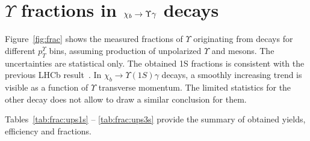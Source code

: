 \section[$\Upsilon$ fractions]{\texorpdfstring{$\Upsilon$}{Y} fractions in \texorpdfstring{$\chi_{{b}} \rightarrow \Upsilon \gamma$}{chib --> Y gamma} decays}
\label{sec:fraction}

Figure~\ref{fig:frac} shows the measured fractions of $\Upsilon$ originating
from \chib decays for different $p_T^{\Upsilon}$ bins,  assuming production of
unpolarized $\Upsilon$ and \chib mesons. The uncertainties are statistical
only. The obtained \Y1S fractions is consistent with the previous LHCb
result~\cite{LHCb-PAPER-2012-015}. In $\chi_b \rightarrow \Upsilon(1S) \gamma$
decays, a smoothly increasing trend is visible as a function of $\Upsilon$
transverse momentum. The limited statistics for the other decay does not allow
to draw a similar conclusion for them.




Tables~\ref{tab:frac:ups1s} -- \ref{tab:frac:ups3s} provide the summary
of obtained yields, efficiency and fractions.


